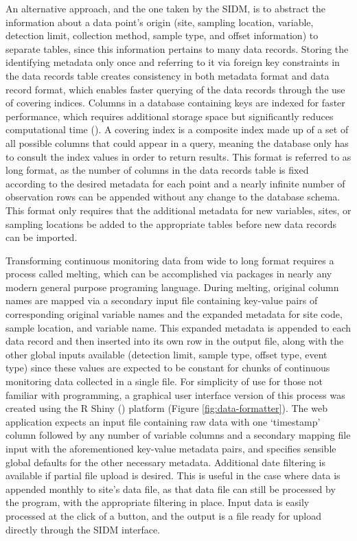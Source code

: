 An alternative approach, and the one taken by the SIDM, is to abstract the information about a data point's origin (site, sampling location, variable, detection limit, collection method, sample type, and offset information) to separate tables, since this information pertains to many data records.
Storing the identifying metadata only once and referring to it via foreign key constraints in the data records table creates consistency in both metadata format and data record format, which enables faster querying of the data records through the use of covering indices.
Columns in a database containing keys are indexed for faster performance, which requires additional storage space but significantly reduces computational time (\cite{lightstone2010physical}).
A covering index is a composite index made up of a set of all possible columns that could appear in a query, meaning the database only has to consult the index values in order to return results.
This format is referred to as long format, as the number of columns in the data records table is fixed according to the desired metadata for each point and a nearly infinite number of observation rows can be appended without any change to the database schema.
This format only requires that the additional metadata for new variables, sites, or sampling locations be added to the appropriate tables before new data records can be imported.

Transforming continuous monitoring data from wide to long format requires a process called melting, which can be accomplished via packages in nearly any modern general purpose programing language.
During melting, original column names are mapped via a secondary input file containing key-value pairs of corresponding original variable names and the expanded metadata for site code, sample location, and variable name.
This expanded metadata is appended to each data record and then inserted into its own row in the output file, along with the other global inputs available (detection limit, sample type, offset type, event type) since these values are expected to be constant for chunks of continuous monitoring data collected in a single file.
For simplicity of use for those not familiar with programming, a graphical user interface version of this process was created using the R Shiny (\cite{RStudioTeam2020}) platform (Figure \ref{fig:data-formatter}).
The web application expects an input file containing raw data with one `timestamp' column followed by any number of variable columns and a secondary mapping file input with the aforementioned key-value metadata pairs, and specifies sensible global defaults for the other necessary metadata.
Additional date filtering is available if partial file upload is desired.
This is useful in the case where data is appended monthly to site's data file, as that data file can still be processed by the program, with the appropriate filtering in place.
Input data is easily processed at the click of a button, and the output is a file ready for upload directly through the SIDM interface.


